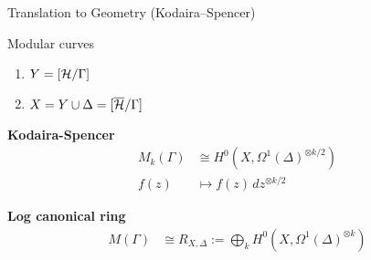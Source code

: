 \begin{frame}{Translation to Geometry (Kodaira--Spencer)}

  \begin{block}{Modular curves}
    
  \begin{enumerate}
  \item $Y = [{\mathcal H} / \Gamma]$
  \item $X = Y \cup \Delta = [\overline{{\mathcal H}} / \Gamma]$

  \end{enumerate}
\end{block}

  \begin{block}{\textbf{Kodaira-Spencer}}
\[
\begin{aligned}
  M_k(\Gamma) &\cong H^0(X, \Omega^1(\Delta)^{\otimes k/2}) \\
f(z) &\mapsto f(z)\,dz^{\otimes k/2}
\end{aligned}
\]

\end{block}

\begin{block}{\textbf{Log canonical ring}}
\[
\begin{aligned}
  M(\Gamma) &\cong R_{X,\Delta} := \bigoplus_k H^0(X, \Omega^1(\Delta)^{\otimes k}) \\
\end{aligned}
\]


  \end{block}

\end{frame}
